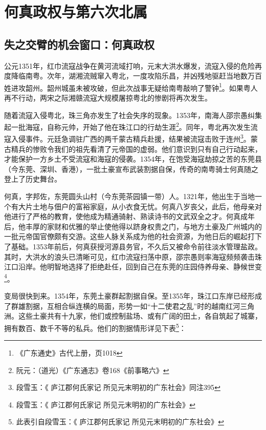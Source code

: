 \chapter{何真政权与第六次北属}

\section{失之交臂的机会窗口：何真政权}

\indent 公元1351年，红巾流寇战争在黄河流域打响，元末大洪水爆发，流寇入侵的危险再度降临南粤。次年，湖湘流贼窜入粤北，一度攻陷乐昌，并凶残地驱赶当地数万百姓进攻韶州。韶州城虽未被攻破，但此次战事无疑给南粤敲响了警钟\footnote{《广东通史》古代上册，页1018}。如果粤人再不行动，两宋之际湘赣流寇大规模屠掠粤北的惨剧将再次发生。

随着流寇入侵粤北，珠三角亦发生了社会失序的现象。1353年，南海人邵宗愚纠集起一批海寇，自称元帅，开始了他在珠江口的行劫生涯\footnote{阮元：（道光）《广东通志》卷168《前事略六》}。同年，粤北再次发生流寇入侵事件。元廷急调驻广西的两千蒙古精兵赴援，结果被流寇击败于连州\footnote{段雪玉：《 庐江郡何氏家记 所见元末明初的广东社会》同注395}。蒙古精兵的惨败令我们的祖先看清了元帝国的虚弱。他们意识到只有自己行动起来，才能保护一方乡土不受流寇和海寇的侵袭。1354年，在饱受海寇劫掠之苦的东莞县（今东莞、深圳、香港），一批土豪宣布武装割据自保，传奇的南粤骑士何真随之登上了历史舞台。

何真，字邦佐，东莞圆头山村（今东莞茶园镇一带）人。1321年，他出生于当地一个有大片土地与佃户的富裕家庭，从小衣食无忧。何真八岁丧父，此后，他母亲对他进行了严格的教育，使他成为精通骑射、熟读诗书的文武双全之才。何真成年后，他丰厚的家财和优雅的举止使他得以跻身权贵之门，与地方土豪及广州城内的一批元帝国官僚颇有交游。这些人脉关系成为他的社会资源，为他日后的崛起打下了基础。1353年前后，何真获授河源县务官，不久后又被命令前往淡水管理盐政。其时，大洪水的浪头已清晰可见，红巾流寇扫荡中原，邵宗愚则率海寇频频袭击珠江口沿岸。他明智地选择了拒绝赴任，回到自己在东莞的庄园侍养母亲、静候世变\footnote{段雪玉：《 庐江郡何氏家记 所见元末明初的广东社会》}。

变局很快到来。1354年，东莞土豪群起割据自保。至1355年，珠江口东岸已经形成了群雄割据，互相合纵连横的局面，形势一如“十二使君之乱”时的越南红河三角洲。这些土豪共有十九家，他们或控制盐场、或有广阔的田土，各自筑起了城寨，拥有数百、数千不等的私兵。他们的割据情形详见下表\footnote{此表引自段雪玉：《 庐江郡何氏家记 所见元末明初的广东社会》}：

